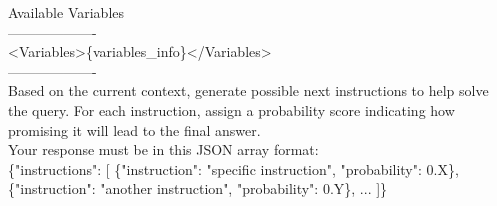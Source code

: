 \documentclass{article} %
\begin{document}
\begin{prompt}[title={Prompt \thetcbcounter: Instruction Generator in Stepwise Reasoner}]
Available Variables\\
-------------------\\
<Variables>\{variables\_info\}</Variables>\\
-------------------\\
Based on the current context, generate possible next instructions to help solve the query. For each instruction, assign a probability score indicating how promising it will lead to the final answer.\\
Your response must be in this JSON array format:\\
\{"instructions": [
        \{"instruction": "specific instruction", "probability": 0.X\},
        \{"instruction": "another instruction", "probability": 0.Y\},
        ...
]\}
\end{prompt}
\end{document}
